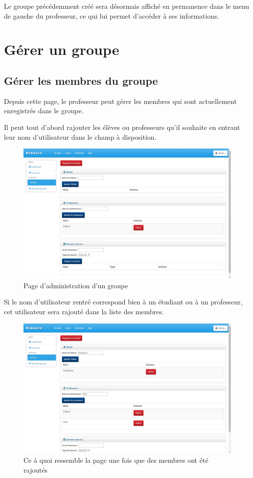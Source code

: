 \documentclass[letterpaper,10pt,french]{sphinxmanual}
\begin{document}
Le groupe précédemment créé sera désormais affiché en permanence dans le menu
de gauche du professeur, ce qui lui permet d'accéder à ses informations.


\section{Gérer un groupe}
\label{dashboard:gerer-un-groupe}

\subsection{Gérer les membres du groupe}
\label{dashboard:gerer-les-membres-du-groupe}
Depuis cette page, le professeur peut gérer les membres qui sont actuellement
enregistrés dans le groupe.

Il peut tout d'abord rajouter les élèves ou professeurs qu'il souhaite en
entrant leur nom d'utilisateur dans le champ à disposition.
\begin{figure}[htbp]
\centering
\capstart

\includegraphics[width=0.700\linewidth]{class.jpg}
\caption{Page d'administration d'un groupe}\end{figure}

Si le nom d'utilisateur rentré correspond bien à un étudiant ou à un professeur,
cet utilisateur sera rajouté dans la liste des membres.
\begin{figure}[htbp]
\centering
\capstart

\includegraphics[width=0.700\linewidth]{classAjouterMembres.jpg}
\caption{Ce à quoi ressemble la page une fois que des membres ont été rajoutés}\end{figure}
\end{document}
